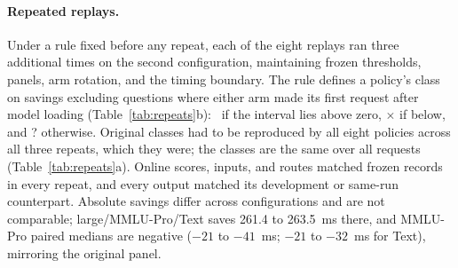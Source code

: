 \paragraph{Repeated replays.} Under a rule fixed before any repeat, each of the eight replays ran three additional times on the second configuration, maintaining frozen thresholds, panels, arm rotation, and the timing boundary. The rule defines a policy's class on savings excluding questions where either arm made its first request after model loading (Table~\ref{tab:repeats}b): \checkmark\ if the interval lies above zero, $\times$ if below, and ? otherwise. Original classes had to be reproduced by all eight policies across all three repeats, which they were; the classes are the same over all requests (Table~\ref{tab:repeats}a). Online scores, inputs, and routes matched frozen records in every repeat, and every output matched its development or same-run counterpart. Absolute savings differ across configurations and are not comparable; large/MMLU-Pro/Text saves 261.4 to 263.5~ms there, and MMLU-Pro paired medians are negative ($-21$ to $-41$~ms; $-21$ to $-32$~ms for Text), mirroring the original panel.


